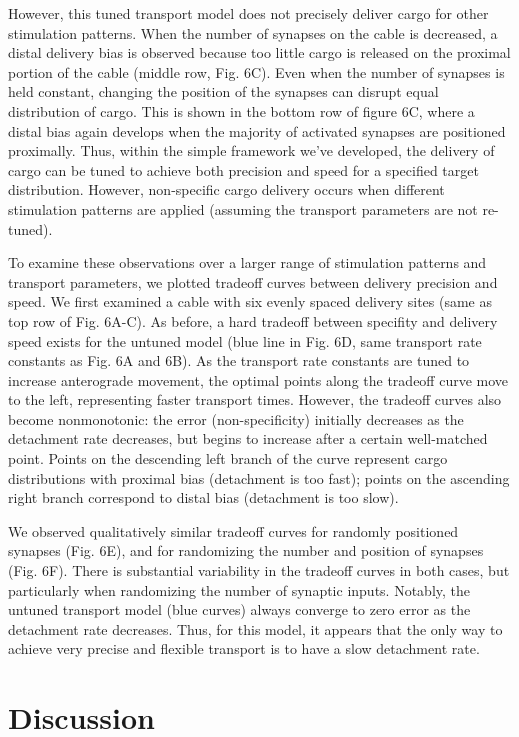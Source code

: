 \documentclass[10pt]{wlpeerj}
\begin{document}
However, this tuned transport model does not precisely deliver cargo for other stimulation patterns.
When the number of synapses on the cable is decreased, a distal delivery bias is observed because too little cargo is released on the proximal portion of the cable (middle row, Fig. 6C).
Even when the number of synapses is held constant, changing the position of the synapses can disrupt equal distribution of cargo. This is shown in the bottom row of figure 6C, where a distal bias again develops when the majority of activated synapses are positioned proximally.
Thus, within the simple framework we've developed, the delivery of cargo can be tuned to achieve both precision and speed for a specified target distribution.
However, non-specific cargo delivery occurs when different stimulation patterns are applied (assuming the transport parameters are not re-tuned).

To examine these observations over a larger range of stimulation patterns and transport parameters, we plotted tradeoff curves between delivery precision and speed.
We first examined a cable with six evenly spaced delivery sites (same as top row of Fig. 6A-C).
As before, a hard tradeoff between specifity and delivery speed exists for the untuned model (blue line in Fig. 6D, same transport rate constants as Fig. 6A and 6B).
As the transport rate constants are tuned to increase anterograde movement, the optimal points along the tradeoff curve move to the left, representing faster transport times.
However, the tradeoff curves also become nonmonotonic: the error (non-specificity) initially decreases as the detachment rate decreases, but begins to increase after a certain well-matched point.
Points on the descending left branch of the curve represent cargo distributions with proximal bias (detachment is too fast); points on the ascending right branch correspond to distal bias (detachment is too slow).

We observed qualitatively similar tradeoff curves for randomly positioned synapses (Fig. 6E), and for randomizing the number and position of synapses (Fig. 6F). There is substantial variability in the tradeoff curves in both cases, but particularly when randomizing the number of synaptic inputs. Notably, the untuned transport model (blue curves) always converge to zero error as the detachment rate decreases. Thus, for this model, it appears that the only way to achieve very precise and flexible transport is to have a slow detachment rate.

\section*{Discussion}
\end{document}
